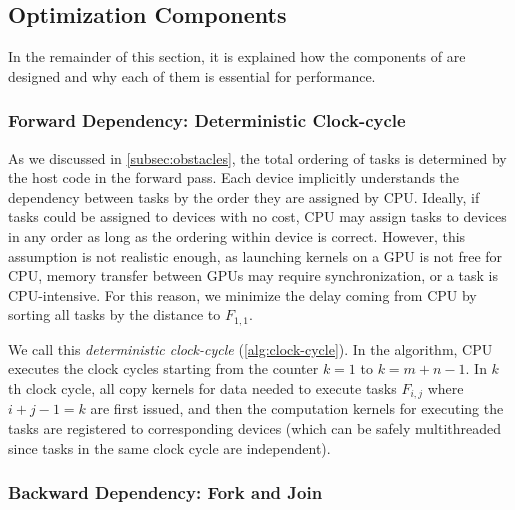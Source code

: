 \subsection{Optimization Components}
\label{subsec:implementation}
In the remainder of this section, it is explained how the components of {\torchgpipe} are designed and why each of them is essential for performance.

\subsubsection{Forward Dependency: Deterministic Clock-cycle}
\label{subsubsec:deterministic-clock-cycle}
As we discussed in \autoref{subsec:obstacles}, the total ordering of tasks is determined by the host code in the forward pass. Each device implicitly understands the dependency between tasks by the order they are assigned by CPU. Ideally, if tasks could be assigned to devices with no cost, CPU may assign tasks to devices in any order as long as the ordering within device is correct. However, this assumption is not realistic enough, as launching kernels on a GPU is not free for CPU, memory transfer between GPUs may require synchronization, or a task is CPU-intensive. For this reason, we minimize the delay coming from CPU by sorting all tasks by the distance to $F_{1,1}$.

\begin{algorithm}
\caption{Deterministic clock-cycle}
\label{alg:clock-cycle}
\end{algorithm}

We call this \emph{deterministic clock-cycle} (\autoref{alg:clock-cycle}). In the algorithm, CPU executes the clock cycles starting from the counter $k=1$ to $k=m+n-1$. In $k$th clock cycle, all copy kernels for data needed to execute tasks $F_{i,j}$ where $i+j-1=k$ are first issued, and then the computation kernels for executing the tasks are registered to corresponding devices (which can be safely multithreaded since tasks in the same clock cycle are independent). 


\subsubsection{Backward Dependency: Fork and Join}
\label{subsubsec:fork-join}

